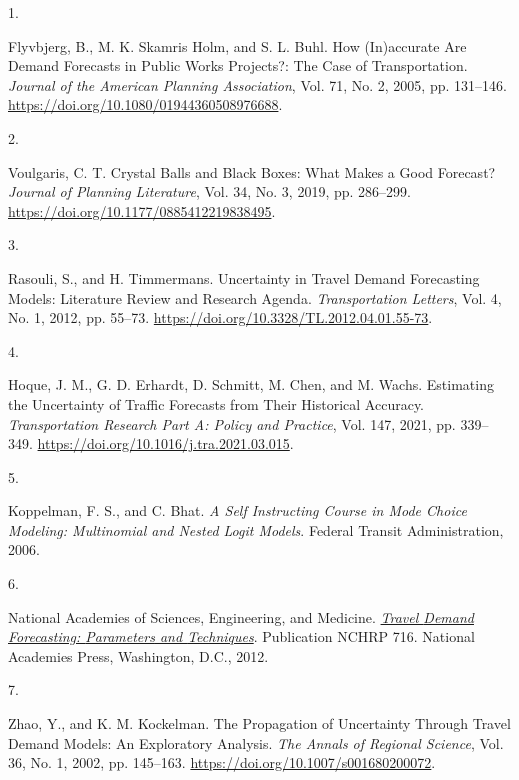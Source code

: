 \documentclass[
  letterpaper,
]{trb}
\newlength{\cslhangindent}
\newlength{\csllabelwidth}
\newlength{\cslentryspacingunit} %
\newenvironment{CSLReferences}[2] %
 {%
  \setlength{\parindent}{0pt}
  \ifodd #1
  \let\oldpar\par
  \def\par{\hangindent=\cslhangindent\oldpar}
  \fi
  \setlength{\parskip}{#2\cslentryspacingunit}
 }%
 {}
\newcommand{\CSLLeftMargin}[1]{\parbox[t]{\csllabelwidth}{#1}}
\newcommand{\CSLRightInline}[1]{\parbox[t]{\linewidth - \csllabelwidth}{#1}\break}
\begin{document}
\hypertarget{refs}{}
\begin{CSLReferences}{0}{0}
\leavevmode{}%
\CSLLeftMargin{1. }%
\CSLRightInline{Flyvbjerg, B., M. K. Skamris Holm, and S. L. Buhl. How
({In})accurate {Are Demand Forecasts} in {Public Works Projects}?: {The
Case} of {Transportation}. \emph{Journal of the American Planning
Association}, Vol. 71, No. 2, 2005, pp. 131--146.
\url{https://doi.org/10.1080/01944360508976688}.}

\leavevmode{}%
\CSLLeftMargin{2. }%
\CSLRightInline{Voulgaris, C. T. Crystal {Balls} and {Black Boxes}:
{What Makes} a {Good Forecast}? \emph{Journal of Planning Literature},
Vol. 34, No. 3, 2019, pp. 286--299.
\url{https://doi.org/10.1177/0885412219838495}.}

\leavevmode{}%
\CSLLeftMargin{3. }%
\CSLRightInline{Rasouli, S., and H. Timmermans. Uncertainty in Travel
Demand Forecasting Models: Literature Review and Research Agenda.
\emph{Transportation Letters}, Vol. 4, No. 1, 2012, pp. 55--73.
\url{https://doi.org/10.3328/TL.2012.04.01.55-73}.}

\leavevmode{}%
\CSLLeftMargin{4. }%
\CSLRightInline{Hoque, J. M., G. D. Erhardt, D. Schmitt, M. Chen, and M.
Wachs. Estimating the Uncertainty of Traffic Forecasts from Their
Historical Accuracy. \emph{Transportation Research Part A: Policy and
Practice}, Vol. 147, 2021, pp. 339--349.
\url{https://doi.org/10.1016/j.tra.2021.03.015}.}

\leavevmode{}%
\CSLLeftMargin{5. }%
\CSLRightInline{Koppelman, F. S., and C. Bhat. \emph{A {Self Instructing
Course} in {Mode Choice Modeling}: {Multinomial} and {Nested Logit
Models}}. {Federal Transit Administration}, 2006.}

\leavevmode{}%
\CSLLeftMargin{6. }%
\CSLRightInline{National Academies of Sciences, Engineering, and
Medicine. \emph{\href{https://doi.org/10.17226/14665}{Travel {Demand
Forecasting}: {Parameters} and {Techniques}}}. Publication NCHRP 716.
{National Academies Press}, {Washington, D.C.}, 2012.}

\leavevmode{}%
\CSLLeftMargin{7. }%
\CSLRightInline{Zhao, Y., and K. M. Kockelman. The Propagation of
Uncertainty Through Travel Demand Models: {An} Exploratory Analysis.
\emph{The Annals of Regional Science}, Vol. 36, No. 1, 2002, pp.
145--163. \url{https://doi.org/10.1007/s001680200072}.}


\end{CSLReferences}
\end{document}

